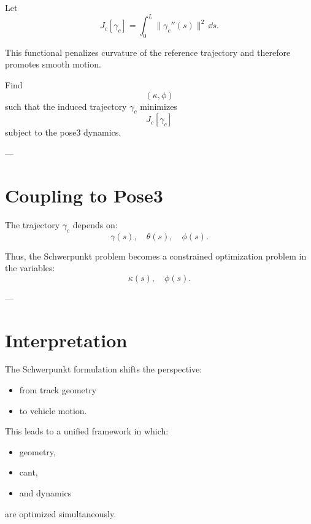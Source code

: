 \begin{definition}
Let
\[
J_c[\gamma_c]
=
\int_0^L
\|\gamma_c''(s)\|^2 \,\dd s.
\]
\end{definition}

\begin{remark}
This functional penalizes curvature of the reference trajectory and
therefore promotes smooth motion.
\end{remark}

\begin{definition}
Find
\[
(\kappa,\phi)
\]
such that the induced trajectory \(\gamma_c\) minimizes
\[
J_c[\gamma_c]
\]
subject to the pose3 dynamics.
\end{definition}

---

\section{Coupling to Pose3}

\begin{remark}
The trajectory \(\gamma_c\) depends on:
\[
\gamma(s), \quad \theta(s), \quad \phi(s).
\]
\end{remark}

\begin{remark}
Thus, the Schwerpunkt problem becomes a constrained optimization problem
in the variables:
\[
\kappa(s), \quad \phi(s).
\]
\end{remark}

---

\section{Interpretation}

\begin{remark}
The Schwerpunkt formulation shifts the perspective:
\begin{itemize}
\item from track geometry
\item to vehicle motion.
\end{itemize}
\end{remark}

\begin{remark}
This leads to a unified framework in which:
\begin{itemize}
\item geometry,
\item cant,
\item and dynamics
\end{itemize}
are optimized simultaneously.
\end{remark}

